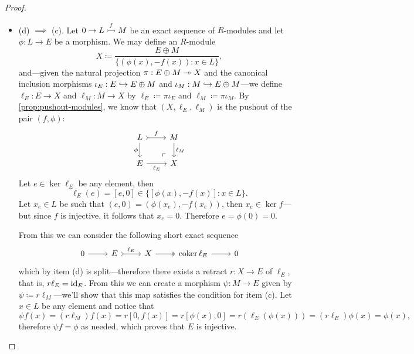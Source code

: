\begin{proof}
\begin{itemize}
        \item (d) \(\implies\) (c). Let \(0 \to L \overset f {\rightarrowtail} M\) be an exact
              sequence of \(R\)-modules and let \(\phi: L \to E\) be a morphism. We may
              define an \(R\)-module
              \[
                  X \coloneq \frac{E \oplus M}{\{(\phi(x), -f(x)) \colon x \in L\}},
              \]
              and---given the natural projection \(\pi: E \oplus M \twoheadrightarrow X\) and the
              canonical inclusion morphisms \(\iota_E: E \hookrightarrow E \oplus M\) and
              \(\iota_M: M \hookrightarrow E \oplus M\)---we define \(\ell_E: E \to X\) and
              \(\ell_M: M \to X\) by \(\ell_E \coloneq \pi \iota_E\) and
              \(\ell_M \coloneq \pi \iota_M\). By \cref{prop:pushout-modules}, we know that
              \((X, \ell_E, \ell_M)\) is the pushout of the pair \((f, \phi)\):
              \[
                  \begin{tikzcd}
                      L \ar[r, tail, "f"] \ar[d, swap, "\phi"]
                      \ar[rd, phantom, very near end, "\ulcorner"]
                      &M \ar[d, "\ell_M"] \\
                      E \ar[r, "\ell_{E}"'] &X
                  \end{tikzcd}
              \]
              Let \(e \in \ker \ell_{E}\) be any element, then
              \[
                  \ell_E(e) = [e, 0] \in \{[\phi(x), -f(x)] \colon x \in L\}.
              \]
              Let \(x_e \in L\) be such that \((e, 0) = (\phi(x_e), -f(x_e))\), then
              \(x_e \in \ker f\)---but since \(f\) is injective, it follows that
              \(x_e = 0\). Therefore \(e = \phi(0) = 0\).

              From this we can consider the following short exact sequence
              \[
                  \begin{tikzcd}
                      0 \ar[r] &E \ar[r, tail, "\ell_E"]
                      &X \ar[r, two heads]
                      &\coker \ell_E \ar[r] &0
                  \end{tikzcd}
              \]
              which by item (d) is split---therefore there exists a retract \(r: X \to E\)
              of \(\ell_E\), that is, \(r \ell_E = \operatorname{id}_E\). From this we can create a
              morphism \(\psi: M \to E\) given by \(\psi \coloneq r \ell_M\)---we'll show
              that this map satisfies the condition for item (c). Let \(x \in L\) be any
              element and notice that
              \[
                  \psi f(x)
                  = (r \ell_M) f(x)
                  = r[0, f(x)]
                  = r[\phi(x), 0]
                  = r(\ell_E(\phi(x)))
                  = (r \ell_E)\phi(x)
                  = \phi(x),
              \]
              therefore \(\psi f = \phi\) as needed, which proves that \(E\) is injective.
    \end{itemize}
\end{proof}

